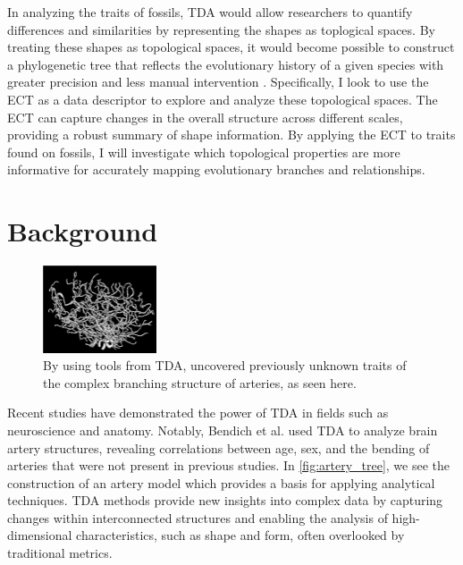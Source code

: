 \documentclass[12pt]{article}
\begin{document}
In analyzing the traits of fossils, TDA would allow researchers to quantify
differences and similarities by representing the shapes as toplogical spaces. By 
treating these shapes as topological spaces, it would become possible to construct a 
phylogenetic tree that reflects the evolutionary history of a given species 
with greater precision and less manual intervention \citep{yang2012}.
Specifically, I look to use the ECT as a data descriptor to explore and analyze
these topological spaces. The ECT can capture changes in the overall structure
across different scales, providing a robust summary of shape information. By
applying the ECT to traits found on fossils, I will investigate which
topological properties are more informative for accurately mapping evolutionary
branches and relationships. 


\section{Background}
\begin{figure}
	\centering
	\vspace{-12pt}
	\includegraphics[width=0.3\textwidth]{arteryTree.png}
	\caption{By using tools from TDA, \cite{bendich2016} uncovered previously
unknown traits of the complex branching structure of arteries, as seen here.}
	\label{fig:artery_tree}
\end{figure}
\vspace{-12pt}

Recent studies have demonstrated the power of TDA in fields such as neuroscience
and anatomy. Notably, Bendich et al. \cite{bendich2016} used
TDA to analyze brain artery structures, revealing correlations between age, sex, 
and the bending of arteries that were not present in previous studies. In
\autoref{fig:artery_tree}, we see the construction of an artery model which
provides a basis for applying analytical techniques. TDA methods provide new 
insights into complex data by capturing changes within interconnected 
structures and enabling the analysis of high-dimensional characteristics, 
such as shape and form, often overlooked by traditional metrics. 
\end{document}
